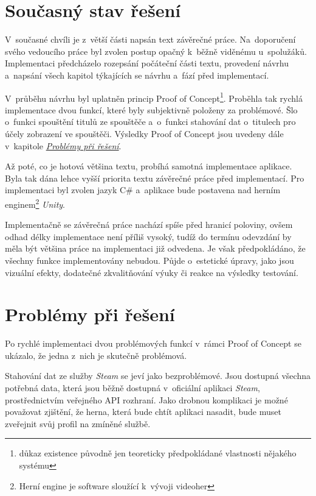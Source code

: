 \documentclass[12pt, a4paper]{article}
\begin{document}
\section{Současný stav řešení}

V~současné chvíli je z~větší části napsán text závěrečné práce. Na~doporučení svého vedoucího práce byl zvolen postup opačný k~běžně viděnému u~spolužáků. Implementaci předcházelo rozepsání počáteční části textu, provedení návrhu a~napsání všech kapitol týkajících se návrhu a~fází před implementací.

V~průběhu návrhu byl uplatněn princip Proof of Concept\footnote{důkaz existence původně jen teoreticky předpokládané vlastnosti nějakého systému\cite{slov}}. Proběhla tak rychlá implementace dvou funkcí, které byly subjektivně položeny za problémové. Šlo o~funkci spouštění titulů ze spouštěče a~o~funkci stahování dat o~titulech pro účely zobrazení ve spouštěči. Výsledky Proof of Concept jsou uvedeny dále v~kapitole \hyperref[problemy]{\textit{Problémy při řešení}}.

Až poté, co je hotová většina textu, probíhá samotná implementace aplikace. Byla tak dána lehce vyšší priorita textu závěrečné práce před implementací. Pro implementaci byl zvolen jazyk C\# a~aplikace bude postavena nad herním enginem\footnote{Herní engine je software sloužící k~vývoji videoher\cite{hernieng}} \textit{Unity}.

Implementačně se závěrečná práce nachází spíše před hranicí poloviny, ovšem odhad délky implementace není příliš vysoký, tudíž do termínu odevzdání by měla být většina práce na implementaci již odvedena. Je však předpokládáno, že všechny funkce implementovány nebudou. Půjde o~estetické úpravy, jako jsou vizuální efekty, dodatečné zkvalitňování výuky či reakce na výsledky testování.

\section{Problémy při řešení}
\label{problemy}

Po rychlé implementaci dvou problémových funkcí v~rámci Proof of Concept se ukázalo, že jedna z~nich je skutečně problémová.

Stahování dat ze služby \textit{Steam} se jeví jako bezproblémové. Jsou dostupná všechna potřebná data, která jsou běžně dostupná v~oficiální aplikaci \textit{Steam}, prostřednictvím veřejného API rozhraní. Jako drobnou komplikaci je možné považovat zjištění, že herna, která bude chtít aplikaci nasadit, bude muset zveřejnit svůj profil na zmíněné službě.
\end{document}
